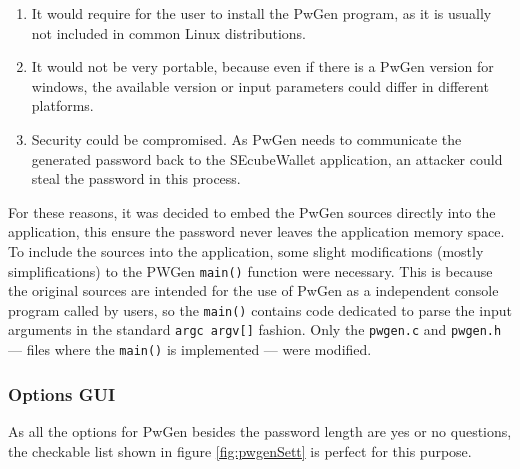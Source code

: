 \begin{enumerate}
\setlength\itemsep{0pt}
\item It would require for the user to install the PwGen program, as it is usually not included in common Linux distributions.
\item It would not be very portable, because even if there is a PwGen version for windows, the available version or input parameters could differ in different platforms.
\item Security could be compromised. As PwGen needs to communicate the generated password back to the SEcubeWallet application, an attacker could steal the password in this process.
\end{enumerate}

For these reasons, it was decided to embed the PwGen sources directly into the application, this ensure the password never leaves the application memory space. 
To include the sources into the application, some slight modifications (mostly simplifications) to the PWGen \texttt{main()} function were necessary. This is because the original sources are intended for the use of PwGen as a independent console program called by users, so the \texttt{main()} contains code dedicated to parse the input arguments in the standard \texttt{argc argv[]} fashion. Only the \texttt{pwgen.c} and \texttt{pwgen.h} --- files where the \texttt{main()} is implemented --- were modified.

\subsubsection*{Options GUI}
As all the options for PwGen besides the password length are yes or no questions, the checkable list shown in figure \ref{fig:pwgenSett} is perfect for this purpose.


